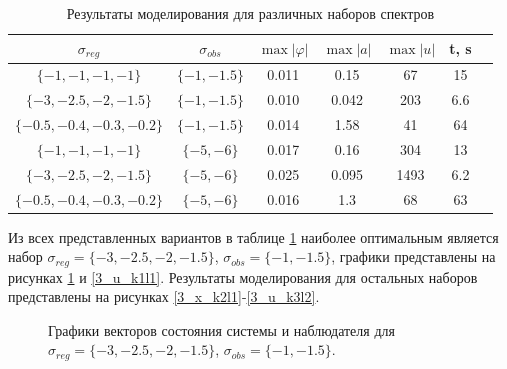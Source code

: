 \begin{table}[h]
\centering
\caption{Результаты моделирования для различных наборов спектров}
\label{3_tab_2}
\begin{tabular}{ccccccc}
\toprule
$\sigma_{reg}$  & $\sigma_{obs}$  & $\max |\varphi|$ & $\max |a|$ & $\max |u|$& t, s \\
\midrule
$\{ -1, -1, -1, -1\}$  & $\{-1, -1.5 \}$  & 0.011  &  0.15  &  67 & 15  \\
$\{ -3, -2.5, -2, -1.5\}$  & $\{-1, -1.5 \}$  & 0.010  &  0.042  &  203 & 6.6  \\
$\{ -0.5, -0.4, -0.3, -0.2\}$  & $\{-1, -1.5 \}$  & 0.014  &  1.58  &  41 & 64 \\
$\{ -1, -1, -1, -1\}$  & $\{-5, -6 \}$  & 0.017  &  0.16  &  304 & 13  \\
$\{ -3, -2.5, -2, -1.5\}$  & $\{-5, -6 \}$  & 0.025  &  0.095  &  1493 & 6.2  \\
$\{ -0.5, -0.4, -0.3, -0.2\}$  & $\{-5, -6 \}$  & 0.016  &  1.3  &  68 & 63  \\
\bottomrule
\end{tabular}
\end{table}

Из всех представленных вариантов в таблице \ref{3_tab_2} наиболее оптимальным является набор $\sigma_{reg} = \{ -3, -2.5, -2, -1.5\}$, $\sigma_{obs}= \{-1, -1.5 \}$, графики представлены на рисунках \ref{3_x_k1l1} и \ref{3_u_k1l1}. Результаты моделирования для остальных наборов представлены на рисунках \ref{3_x_k2l1}-\ref{3_u_k3l2}.

\begin{figure}[!h]
\caption{Графики векторов состояния системы и наблюдателя для $\sigma_{reg} = \{ -3, -2.5, -2, -1.5\}$, $\sigma_{obs}= \{-1, -1.5 \}$.}
\label{3_x_k1l1}
\end{figure}

